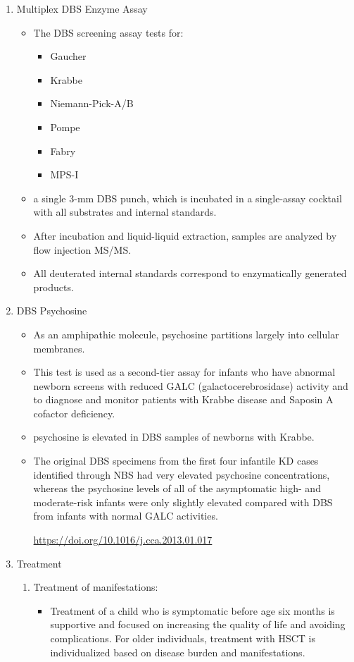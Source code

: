 \documentclass{scrartcl}
\begin{document}
\begin{enumerate}
\item Multiplex DBS  Enzyme Assay
\label{sec:orgd4d20f0}
\begin{itemize}
\item The DBS screening assay tests for:
\begin{itemize}
\item Gaucher
\item Krabbe
\item Niemann-Pick-A/B
\item Pompe
\item Fabry
\item MPS-I
\end{itemize}
\item a single 3-mm DBS punch, which is incubated in a single-assay
cocktail with all substrates and internal standards.
\item After incubation and liquid-liquid extraction, samples are analyzed by flow injection MS/MS.
\item All deuterated internal standards correspond to enzymatically generated products.
\end{itemize}


\item DBS Psychosine
\label{sec:org3576f99}
\begin{itemize}
\item As an amphipathic molecule, psychosine partitions largely into
cellular membranes.
\item This test is used as a second-tier assay for infants who have
abnormal newborn screens with reduced GALC (galactocerebrosidase)
activity and to diagnose and monitor patients with Krabbe disease
and Saposin A cofactor deficiency.

\item psychosine is elevated in DBS samples of newborns with Krabbe.

\item The original DBS specimens from the first four infantile
KD cases identified through NBS had very elevated psychosine
concentrations, whereas the psychosine levels of all of the
asymptomatic high- and moderate-risk infants were only slightly
elevated compared with DBS from infants with normal GALC activities.

\url{https://doi.org/10.1016/j.cca.2013.01.017}
\end{itemize}


\item Treatment
\label{sec:org7b15a27}

\begin{enumerate}
\item Treatment of manifestations:
\label{sec:org651118d}
\begin{itemize}
\item Treatment of a child who is symptomatic before age six months is
supportive and focused on increasing the quality of life and
avoiding complications. For older individuals, treatment with HSCT
is individualized based on disease burden and manifestations.
\end{itemize}


\end{enumerate}
\end{enumerate}
\end{document}

